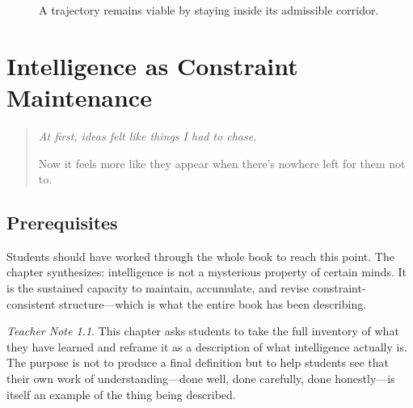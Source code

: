 \documentclass[11pt]{book}
\theoremstyle{definition}
\theoremstyle{remark}
\newtheorem{teachernote}{Teacher Note}[chapter]
\newenvironment{deepthought}
  {\begin{quote}\itshape}
  {\end{quote}}
\begin{document}
\begin{figure}[h]
\centering
{}
\caption{A trajectory remains viable by staying inside its admissible corridor.}
\end{figure}

\chapter{Intelligence as Constraint Maintenance}

\begin{deepthought}
At first, ideas felt like things I had to chase.

Now it feels more like they appear when there's nowhere left for them
not to.
\end{deepthought}

\section*{Prerequisites}

Students should have worked through the whole book to reach this point.
The chapter synthesizes: intelligence is not a mysterious property of
certain minds. It is the sustained capacity to maintain, accumulate, and
revise constraint-consistent structure---which is what the entire book
has been describing.

\begin{teachernote}
This chapter asks students to take the full inventory of what they have
learned and reframe it as a description of what intelligence actually is.
The purpose is not to produce a final definition but to help students
see that their own work of understanding---done well, done carefully,
done honestly---is itself an example of the thing being described.
\end{teachernote}
\end{document}
